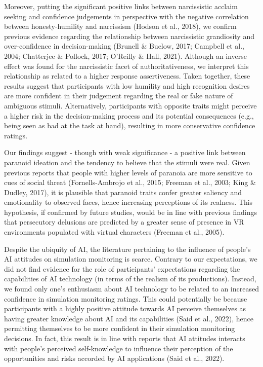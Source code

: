 \documentclass[
  man,floatsintext]{apa6}
\begin{document}
Moreover, putting the significant positive links between narcissistic acclaim seeking and confidence judgements in perspective with the negative correlation between honesty-humility and narcissism (Hodson et al., 2018), we confirm previous evidence regarding the relationship between narcissistic grandiosity and over-confidence in decision-making (Brunell \& Buelow, 2017; Campbell et al., 2004; Chatterjee \& Pollock, 2017; O'Reilly \& Hall, 2021). Although an inverse effect was found for the narcissistic facet of authoritativeness, we interpret this relationship as related to a higher response assertiveness. Taken together, these results suggest that participants with low humility and high recognition desires are more confident in their judgement regarding the real or fake nature of ambiguous stimuli. Alternatively, participants with opposite traits might perceive a higher risk in the decision-making process and its potential consequences (e.g., being seen as bad at the task at hand), resulting in more conservative confidence ratings.

Our findings suggest - though with weak significance - a positive link between paranoid ideation and the tendency to believe that the stimuli were real. Given previous reports that people with higher levels of paranoia are more sensitive to cues of social threat (Fornells-Ambrojo et al., 2015; Freeman et al., 2003; King \& Dudley, 2017), it is plausible that paranoid traits confer greater saliency and emotionality to observed faces, hence increasing perceptions of its realness. This hypothesis, if confirmed by future studies, would be in line with previous findings that persecutory delusions are predicted by a greater sense of presence in VR environments populated with virtual characters (Freeman et al., 2005).

Despite the ubiquity of AI, the literature pertaining to the influence of people's AI attitudes on simulation monitoring is scarce. Contrary to our expectations, we did not find evidence for the role of participants' expectations regarding the capabilities of AI technology (in terms of the realism of its productions). Instead, we found only one's enthusiasm about AI technology to be related to an increased confidence in simulation monitoring ratings. This could potentially be because participants with a highly positive attitude towards AI perceive themselves as having greater knowledge about AI and its capabilities (Said et al., 2022), hence permitting themselves to be more confident in their simulation monitoring decisions. In fact, this result is in line with reports that AI attitudes interacts with people's perceived self-knowledge to influence their perception of the opportunities and risks accorded by AI applications (Said et al., 2022).
\end{document}
